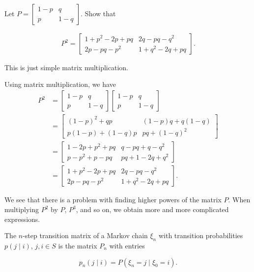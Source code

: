 \begin{Exercise}
\label{exr:compute-p-squared}
Let $P = \begin{bmatrix} 1-p & q \\ p & 1-q \end{bmatrix}$. Show that

\begin{align}
P^2 = \begin{bmatrix}
1+p^2-2p+pq & 2q-pq-q^2 \\
2p-pq-p^2 & 1+q^2-2q+pq
\end{bmatrix}.
\end{align}

\begin{hint}
This is just simple matrix multiplication.
\end{hint}
\end{Exercise}

\begin{Solution}
Using matrix multiplication, we have
\begin{align*}
P^2 &= \begin{bmatrix} 1-p & q \\ p & 1-q \end{bmatrix} \begin{bmatrix} 1-p & q \\ p & 1-q \end{bmatrix} \\
&= \begin{bmatrix} (1-p)^2 + qp & (1-p)q + q(1-q) \\ p(1-p) + (1-q)p & pq + (1-q)^2 \end{bmatrix} \\
&= \begin{bmatrix} 1-2p+p^2+pq & q-pq+q-q^2 \\ p-p^2+p-pq & pq+1-2q+q^2 \end{bmatrix} \\
&= \begin{bmatrix} 1+p^2-2p+pq & 2q-pq-q^2 \\ 2p-pq-p^2 & 1+q^2-2q+pq \end{bmatrix}.
\end{align*}
\end{Solution}

We see that there is a problem with finding higher powers of the matrix $P$. When multiplying $P^2$ by $P$, $P^3$, and so on, we obtain more and more complicated expressions.

\begin{Definition}
\label{def:n-step-transition}
The $n$-step transition matrix of a Markov chain $\xi_n$ with transition probabilities $p(j \mid i)$, $j, i\in S$ is the matrix $P_n$ with entries

\begin{equation}
p_n(j \mid i) = P(\xi_n = j \mid \xi_0 = i). \tag{5.17}
\end{equation}
\end{Definition}

